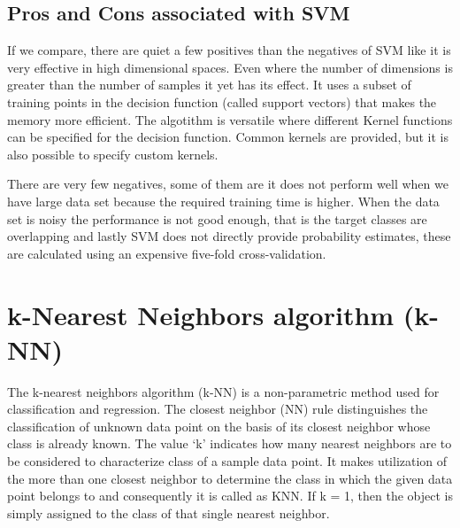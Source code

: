 \subsection{Pros and Cons associated with SVM} \label{Pros and Cons associated with SVM}

\noindent If we compare, there are quiet a few positives than the negatives of SVM like it is very effective in high dimensional spaces. Even where the number of dimensions is greater than the number of samples it yet has its effect. It uses a subset of training points in the decision function (called support vectors) that makes the memory more efficient. The algotithm is versatile where different Kernel functions can be specified for the decision function. Common kernels are
provided, but it is also possible to specify custom kernels. 

\noindent There are very few negatives, some of them are it does not perform well when we have large data set because the required training time is higher. When the data set is noisy the performance is not good enough, that is the target classes are overlapping and lastly SVM does not directly provide probability estimates, these are calculated using an expensive five-fold cross-validation.


\newpage

\section{k-Nearest Neighbors algorithm (k-NN)} \label{k-Nearest Neighbors algorithm (k-NN)}
\noindent The k-nearest neighbors algorithm (k-NN) is a non-parametric method used for classification and regression. The closest neighbor (NN) rule distinguishes the classification of unknown data point on the basis of its closest neighbor whose class is already known. The value ‘k’ indicates how many nearest neighbors are to be considered to characterize class of a sample data point. It makes utilization of the more than one closest neighbor to determine the class in which the given data point belongs to and consequently it is called as KNN. If k = 1, then the object is simply assigned to the class of that single nearest neighbor.


